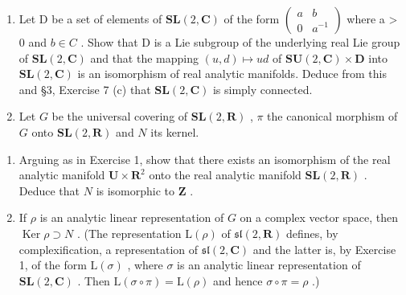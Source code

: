 
\begin{enumerate}
\def\labelenumi{\arabic{enumi}.}
\item
  Let D be a set of elements of \(\mathbf{SL}(2,\mathbf{C})\) of the form \(\begin{pmatrix}a & b \\ 0 & a^{-1}\end{pmatrix}\) where a \textgreater{} 0 and \(b \in C\) . Show that D is a Lie subgroup of the underlying real Lie group of \(\mathbf{SL}(2,\mathbf{C})\) and that the mapping \((u,d) \mapsto ud\) of \(\mathbf{SU}(2,\mathbf{C}) \times \mathbf{D}\) into \(\mathbf{SL}(2,\mathbf{C})\) is an isomorphism of real analytic manifolds. Deduce from this and §3, Exercise 7 (c) that \(\mathbf{SL}(2,\mathbf{C})\) is simply connected.
\item
  Let \(G\) be the universal covering of \(\mathbf{SL}(2, \mathbf{R})\) , \(\pi\) the canonical morphism of \(G\) onto \(\mathbf{SL}(2, \mathbf{R})\) and \(N\) its kernel.
\end{enumerate}

\begin{enumerate}
\def\labelenumi{(\alph{enumi})}
\item
  Arguing as in Exercise 1, show that there exists an isomorphism of the real analytic manifold \(\mathbf{U} \times \mathbf{R}^2\) onto the real analytic manifold \(\mathbf{SL}(2, \mathbf{R})\) . Deduce that \(N\) is isomorphic to \(\mathbf{Z}\) .
\item
  If \(\rho\) is an analytic linear representation of \(G\) on a complex vector space, then \(\operatorname{Ker} \rho \supset N\) . (The representation \(\mathrm{L}(\rho)\) of \(\mathfrak{sl}(2, \mathbf{R})\) defines, by complexification, a representation of \(\mathfrak{sl}(2, \mathbf{C})\) and the latter is, by Exercise 1, of the form \(\mathrm{L}(\sigma)\) , where \(\sigma\) is an analytic linear representation of \(\mathbf{SL}(2, \mathbf{C})\) . Then \(\mathrm{L}(\sigma \circ \pi) = \mathrm{L}(\rho)\) and hence \(\sigma \circ \pi = \rho\) .)
\end{enumerate}

